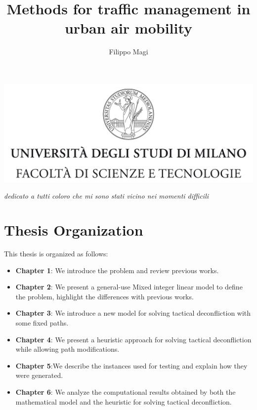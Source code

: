 \documentclass[a4paper,12pt]{report}
\begin{document}
\includegraphics[width=\textwidth]{thesis/picture/tesiSCIENZE_TECNOLOGIE.jpg}
\title{Methods for traffic management in urban air mobility}
\author{Filippo Magi}
%
% 
%
\beforepreface
\prefacesection{}
        {\hfill \Large {\sl dedicato a tutti coloro che mi sono stati vicino nei momenti difficili}}
% 
%

%
%
\section*{Thesis Organization}
\label{organizzazione}

This thesis is organized as follows:
\begin{itemize}
    \item \textbf{Chapter 1}: We introduce the problem and review previous works.
    \item \textbf{Chapter 2}: We present a general-use Mixed integer linear model to define the problem, highlight the differences with previous works.
    \item \textbf{Chapter 3}: We introduce a new model for solving tactical deconfliction with some fixed paths.
    \item \textbf{Chapter 4}: We present a heuristic approach for solving tactical deconfliction while allowing path modifications.
    \item \textbf{Chapter 5}:We describe the instances used for testing and explain how they were generated.
    \item \textbf{Chapter 6}: We analyze the computational results obtained by both the mathematical model and the heuristic for solving tactical deconfliction.
\end{itemize}
% 
% 
\end{document}
